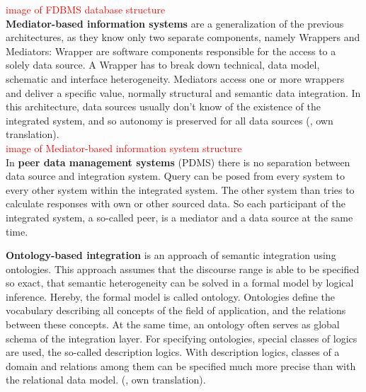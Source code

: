 \textcolor{red}{image of FDBMS database structure}\\

\textbf{Mediator-based information systems} are a generalization of the previous architectures, as they know only two separate components, namely Wrappers and Mediators: Wrapper are software components responsible for the access to a solely data source. A Wrapper has to break down technical, data model, schematic and interface heterogeneity. Mediators access one or more wrappers and deliver a specific value, normally structural and semantic data integration.
In this architecture, data sources usually don't know of the existence of the integrated system, and so autonomy is preserved for all data sources (\cite[p. 97]{DBLP:books/dp/LeserN2006}, own translation).\\

\textcolor{red}{image of Mediator-based information system structure}\\ 
 
In \textbf{peer data management systems} (PDMS) there is no separation between data source and integration system. Query can be posed from every system to every other system within the integrated system. The other system than tries to calculate responses with own or other sourced data. So each participant of the integrated system, a so-called peer, is a mediator and a data source at the same time.  

\textbf{Ontology-based integration} is an approach of semantic integration using ontologies. This approach assumes that the discourse range is able to be specified so exact, that semantic heterogeneity can be solved in a formal model by logical inference. Hereby, the formal model is called ontology. Ontologies define the vocabulary describing all concepts of the field of application, and the relations between these concepts. At the same time, an ontology often serves as global schema of the integration layer. For specifying ontologies, special classes of logics are used, the so-called description logics. With description logics, classes of a domain and relations among them can be specified much more precise than with the relational data model. (\cite[p. 267]{DBLP:books/dp/LeserN2006}, own translation).\\